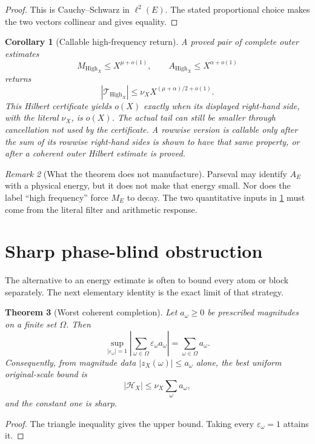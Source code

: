 \documentclass[11pt]{article}
\newtheorem{theorem}{Theorem}[section]
\newtheorem{corollary}[theorem]{Corollary}
\theoremstyle{definition}
\theoremstyle{remark}
\newtheorem{remark}[theorem]{Remark}
\newcommand{\Tail}{\mathcal T}
\newcommand{\High}{\mathrm{High}}
\begin{document}
\begin{proof}
This is Cauchy--Schwarz in \(\ell^2(E)\).  The stated proportional
choice makes the two vectors collinear and gives equality.
\end{proof}

\begin{corollary}[Callable high-frequency return]
\label{cor:callable}
A proved pair of complete outer estimates
\[
 M_{\High_X}\le X^{\mu+o(1)},\qquad
 A_{\High_X}\le X^{\alpha+o(1)}
\]
returns
\[
 |\Tail_{\High_X}|
 \le\nu_X X^{(\mu+\alpha)/2+o(1)}.
\]
This Hilbert certificate yields \(o(X)\) exactly when its displayed
right-hand side, with the literal \(\nu_X\), is \(o(X)\).  The actual
tail can still be smaller through cancellation not used by the
certificate.  A rowwise version is callable only after the sum of its
rowwise right-hand sides is shown to have that same property, or after
a coherent outer Hilbert estimate is proved.
\end{corollary}

\begin{remark}[What the theorem does not manufacture]
Parseval may identify \(A_E\) with a physical energy, but it does not
make that energy small.  Nor does the label ``high frequency'' force
\(M_E\) to decay.  The two quantitative inputs in
\cref{cor:callable} must come from the literal filter and arithmetic
response.
\end{remark}

\section{Sharp phase-blind obstruction}

The alternative to an energy estimate is often to bound every atom
or block separately.  The next elementary identity is the exact
limit of that strategy.

\begin{theorem}[Worst coherent completion]
\label{thm:phaseblind}
Let \(a_\omega\ge0\) be prescribed magnitudes on a finite set
\(\Omega\).  Then
\[
 \boxed{\quad
 \sup_{|\varepsilon_\omega|=1}
 \left|\sum_{\omega\in\Omega}
       \varepsilon_\omega a_\omega\right|
 =\sum_{\omega\in\Omega}a_\omega .
 \quad}
\]
Consequently, from magnitude data
\(|z_X(\omega)|\le a_\omega\) alone, the best uniform original-scale
bound is
\[
 |\mathcal H_X|
 \le\nu_X\sum_\omega a_\omega,
\]
and the constant one is sharp.
\end{theorem}

\begin{proof}
The triangle inequality gives the upper bound.  Taking every
\(\varepsilon_\omega=1\) attains it.
\end{proof}
\end{document}
